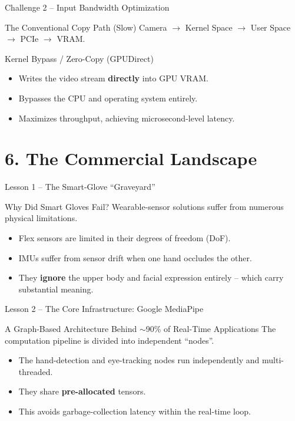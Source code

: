 \documentclass[aspectratio=169]{beamer}
\begin{document}
\begin{frame}{Challenge 2 -- Input Bandwidth Optimization}
    \begin{alertblock}{The Conventional Copy Path (Slow)}
        Camera $\to$ Kernel Space $\to$ User Space $\to$ PCIe $\to$ VRAM.
    \end{alertblock}
    \vspace{0.3cm}
    \begin{exampleblock}{Kernel Bypass / Zero-Copy (GPUDirect)}
        \begin{itemize}
            \item Writes the video stream \textbf{directly} into GPU VRAM.
            \item Bypasses the CPU and operating system entirely.
            \item Maximizes throughput, achieving microsecond-level latency.
        \end{itemize}
    \end{exampleblock}
\end{frame}

\section{6. The Commercial Landscape}
\begin{frame}{Lesson 1 -- The Smart-Glove ``Graveyard''}
    \begin{alertblock}{Why Did Smart Gloves Fail?}
        Wearable-sensor solutions suffer from numerous physical limitations.
    \end{alertblock}
    \vspace{0.3cm}
    \begin{itemize}
        \item Flex sensors are limited in their degrees of freedom (DoF).
        \item IMUs suffer from sensor drift when one hand occludes the other.
        \item They \textbf{ignore} the upper body and facial expression entirely -- which carry substantial meaning.
    \end{itemize}
\end{frame}

\begin{frame}{Lesson 2 -- The Core Infrastructure: Google MediaPipe}
    \begin{block}{A Graph-Based Architecture Behind $\sim$90\% of Real-Time Applications}
        The computation pipeline is divided into independent ``nodes''.
    \end{block}
    \vspace{0.3cm}
    \begin{itemize}
        \item The hand-detection and eye-tracking nodes run independently and multi-threaded.
        \item They share \textbf{pre-allocated} tensors.
        \item This avoids garbage-collection latency within the real-time loop.
    \end{itemize}
\end{frame}
\end{document}
